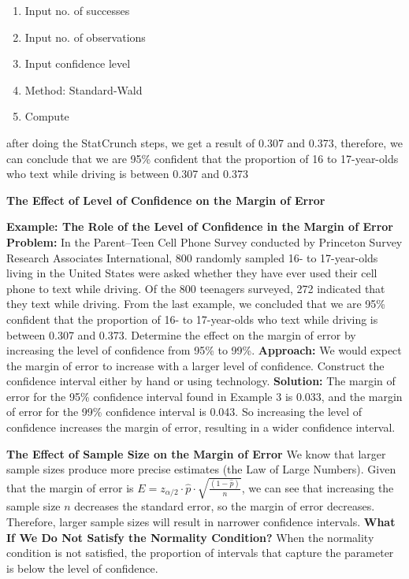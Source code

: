 \documentclass{report}
\begin{document}
\begin{mdframed}
\begin{enumerate}
            \item Input no. of successes
            \item Input no. of observations
            \item Input confidence level
            \item Method: Standard-Wald
            \item Compute
        \end{enumerate}
        \bigbreak \noindent 
        after doing the StatCrunch steps, we get a result of 0.307 and 0.373, therefore, we can conclude that we are 95\% confident that the proportion of 16 to 17-year-olds who text while driving is between 0.307 and 0.373

      \end{mdframed}

      \pagebreak \bigbreak \noindent 
      \textbf{The Effect of Level of Confidence on the Margin of Error}
      \bigbreak \noindent 
      \begin{mdframed}
          \textbf{Example: The Role of the Level of Confidence in the Margin of Error} 
          \bigbreak \noindent 
          \textbf{Problem:}
          In the Parent--Teen Cell Phone Survey conducted by Princeton Survey Research Associates International, 800 randomly sampled 16- to 17-year-olds living in the United States were asked whether they have ever used their cell phone to text while driving. Of the 800 teenagers surveyed, 272 indicated that they text while driving. From the last example, we concluded that we are 95\% confident that the proportion of 16- to 17-year-olds who text while driving is between 0.307 and 0.373. Determine the effect on the margin of error by increasing the level of confidence from 95\% to 99\%.
          \bigbreak \noindent 
          \textbf{Approach:}
          We would expect the margin of error to increase with a larger level of confidence. Construct the confidence interval either by hand or using technology.
          \bigbreak \noindent 
          \textbf{Solution:}
          \bigbreak \noindent 
          The margin of error for the 95\% confidence interval found in Example 3 is 0.033, and the margin of error for the 99\% confidence interval is 0.043. So increasing the level of confidence increases the margin of error, resulting in a wider confidence interval.



        
      \end{mdframed}
      \bigbreak \noindent 
      \textbf{The Effect of Sample Size on the Margin of Error}
      \bigbreak \noindent 
      We know that larger sample sizes produce more precise estimates (the Law of Large Numbers). Given that the margin of error is $E=z_{\alpha/2} \cdot \hat{p} \cdot \sqrt{\frac{(1-\hat{p})}{n}}$, we can see that increasing the sample size $n$ decreases the standard error, so the margin of error decreases. Therefore, larger sample sizes will result in narrower confidence intervals.
      \bigbreak \noindent 
      \textbf{What If We Do Not Satisfy the Normality Condition?}
      \bigbreak \noindent 
     When the normality condition is not satisfied, the proportion of intervals that capture the parameter is below the level of confidence.
\end{document}
